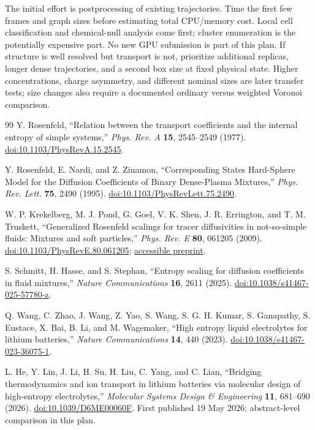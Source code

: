 \documentclass[11pt,a4paper]{article}
\begin{document}
The initial effort is postprocessing of existing trajectories. Time the first
few frames and graph sizes before estimating total CPU/memory cost. Local
cell classification and chemical-null analysis come first; cluster enumeration
is the potentially expensive part. No new GPU submission is part of this plan.
If structure is well resolved but transport is not, prioritize additional
replicas, longer dense trajectories, and a second box size at fixed physical
state. Higher concentrations, charge asymmetry, and different nominal sizes
are later transfer tests; size changes also require a documented ordinary
versus weighted Voronoi comparison.

\begin{thebibliography}{99}
\small
{}
Y. Rosenfeld, ``Relation between the transport coefficients and the internal
entropy of simple systems,'' \textit{Phys. Rev. A} \textbf{15}, 2545--2549 (1977).
\href{https://doi.org/10.1103/PhysRevA.15.2545}{doi:10.1103/PhysRevA.15.2545}.

Y. Rosenfeld, E. Nardi, and Z. Zinamon, ``Corresponding States Hard-Sphere Model
for the Diffusion Coefficients of Binary Dense-Plasma Mixtures,''
\textit{Phys. Rev. Lett.} \textbf{75}, 2490 (1995).
\href{https://doi.org/10.1103/PhysRevLett.75.2490}{doi:10.1103/PhysRevLett.75.2490}.

W. P. Krekelberg, M. J. Pond, G. Goel, V. K. Shen, J. R. Errington, and
T. M. Truskett, ``Generalized Rosenfeld scalings for tracer diffusivities in
not-so-simple fluids: Mixtures and soft particles,'' \textit{Phys. Rev. E}
\textbf{80}, 061205 (2009).
\href{https://doi.org/10.1103/PhysRevE.80.061205}{doi:10.1103/PhysRevE.80.061205};
\href{https://arxiv.org/abs/0910.0280}{accessible preprint}.

S. Schmitt, H. Hasse, and S. Stephan, ``Entropy scaling for diffusion
coefficients in fluid mixtures,'' \textit{Nature Communications}
\textbf{16}, 2611 (2025).
\href{https://doi.org/10.1038/s41467-025-57780-z}{doi:10.1038/s41467-025-57780-z}.

Q. Wang, C. Zhao, J. Wang, Z. Yao, S. Wang, S. G. H. Kumar, S. Ganapathy,
S. Eustace, X. Bai, B. Li, and M. Wagemaker,
``High entropy liquid electrolytes for lithium batteries,''
\textit{Nature Communications} \textbf{14}, 440 (2023).
\href{https://doi.org/10.1038/s41467-023-36075-1}{doi:10.1038/s41467-023-36075-1}.

L. He, Y. Lin, J. Li, H. Su, H. Liu, C. Yang, and C. Lian,
``Bridging thermodynamics and ion transport in lithium batteries via molecular
design of high-entropy electrolytes,'' \textit{Molecular Systems Design \&
Engineering} \textbf{11}, 681--690 (2026).
\href{https://doi.org/10.1039/D6ME00060F}{doi:10.1039/D6ME00060F}.
First published 19 May 2026; abstract-level comparison in this plan.


\end{thebibliography}
\end{document}
